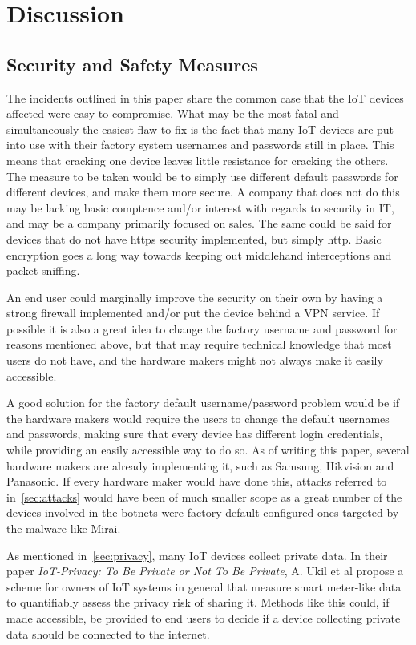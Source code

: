 \documentclass[a4paper, conference]{IEEEtran/IEEEtran}
\begin{document}
\section{Discussion}
\subsection{Security and Safety Measures}
The incidents outlined in this paper share the common case that the IoT devices affected were easy to compromise. What may be the most fatal and simultaneously the easiest flaw to fix is the fact that many IoT devices are put into use with their factory system usernames and passwords still in place. This means that cracking one device leaves little resistance for cracking the others. The measure to be taken would be to simply use different default passwords for different devices, and make them more secure. A company that does not do this may be lacking basic comptence and/or interest with regards to security in IT, and may be a company primarily focused on sales. The same could be said for devices that do not have https security implemented, but simply http. Basic encryption goes a long way towards keeping out middlehand interceptions and packet sniffing.

An end user could marginally improve the security on their own by having a strong firewall implemented and/or put the device behind a VPN service. If possible it is also a great idea to change the factory username and password for reasons mentioned above, but that may require technical knowledge that most users do not have, and the hardware makers might not always make it easily accessible. 

A good solution for the factory default username/password problem would be if the hardware makers would require the users to change the default usernames and passwords, making sure that every device has different login credentials, while providing an easily accessible way to do so. As of writing this paper, several hardware makers are already implementing it, such as Samsung, Hikvision and Panasonic.\cite{ipvm} If every hardware maker would have done this, attacks referred to in~\ref{sec:attacks} would have been of much smaller scope as a great number of the devices involved in the botnets were factory default configured ones targeted by the malware like Mirai.

As mentioned in~\ref{sec:privacy}, many IoT devices collect private data. In their paper \textit{IoT-Privacy: To Be Private or Not To Be Private}, A. Ukil et al propose a scheme for owners of IoT systems in general that measure smart meter-like data to quantifiably assess the privacy risk of sharing it.\cite{tobeprivate} Methods like this could, if made accessible, be provided to end users to decide if a device collecting private data should be connected to the internet.
\end{document}
